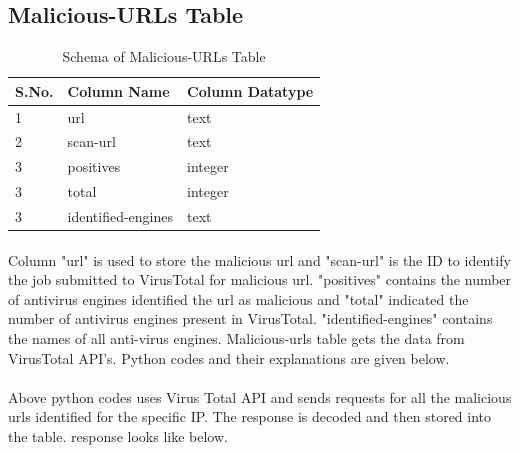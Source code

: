 \documentclass{article}
\begin{document}
\subsection{Malicious-URLs Table}

\begin{table}[H]
\begin{tabular}{ |p{2cm}|p{5cm}|p{5cm}|  }
 \hline
 \textbf{S.No.} & \textbf{Column Name} & \textbf{Column Datatype}\\
 \hline
 \hline
 1 & url & text \\
 \hline
2 & scan-url & text \\
\hline
3 & positives & integer \\
\hline
3 & total & integer \\
\hline
3 & identified-engines & text \\
\hline
\end{tabular}
 \caption{Schema of Malicious-URLs Table}
\end{table}

\paragraph{}
Column "url" is used to store the malicious url and "scan-url" is the ID to identify the job submitted to VirusTotal for malicious url. "positives" contains the number of antivirus engines identified the url as malicious and   "total" indicated the number of antivirus engines present in VirusTotal. "identified-engines" contains the names of all anti-virus engines. Malicious-urls table gets the data from VirusTotal API's. Python codes and their explanations are given below.

 


 


 


 



\paragraph{}
Above python codes uses Virus Total API and sends requests for all the malicious urls identified for the specific IP. The response is decoded and then stored into the table. response looks like below.
\end{document}
